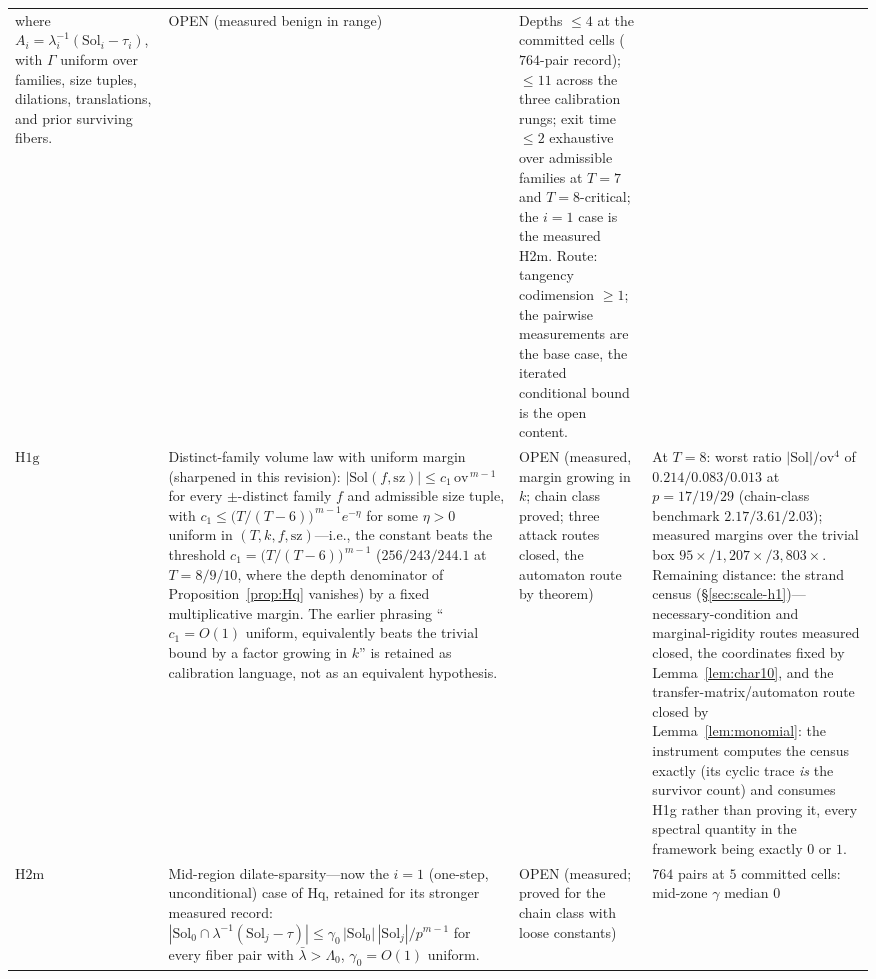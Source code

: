 {\begin{longtable}{@{}p{}p{}
                   p{}p{}@{}}
where $A_i=\lambda_i^{-1}(\mathrm{Sol}_i-\tau_i)$, with $\Gamma$
uniform over families, size tuples, dilations, translations, and prior
surviving fibers. &
OPEN (measured benign in range) &
Depths $\le 4$ at the committed cells ($764$-pair record); $\le 11$
across the three calibration rungs; exit time $\le 2$ exhaustive over
admissible families at $T=7$ and $T=8$-critical; the $i=1$ case is the
measured H2m. Route: tangency codimension $\ge 1$; the pairwise
measurements are the base case, the iterated conditional bound is the
open content. \\
$\mathrm{H1g}$ &
Distinct-family volume law with uniform margin (sharpened in this
revision): $|\mathrm{Sol}(f,\mathrm{sz})|\le
c_1\,\mathrm{ov}^{\,m-1}$ for every $\pm$-distinct family $f$ and
admissible size tuple, with $c_1\le\bigl(T/(T-6)\bigr)^{\,m-1}
e^{-\eta}$ for some $\eta>0$ uniform in $(T,k,f,\mathrm{sz})$---i.e.,
the constant beats the threshold
$c_1=\bigl(T/(T-6)\bigr)^{\,m-1}$ ($256/243/244.1$ at $T=8/9/10$,
where the depth denominator of Proposition~\ref{prop:Hq} vanishes) by
a fixed multiplicative margin. The earlier phrasing ``$c_1=O(1)$
uniform, equivalently beats the trivial bound by a factor growing in
$k$'' is retained as calibration language, not as an equivalent
hypothesis. &
OPEN (measured, margin growing in $k$; chain class proved; three
attack routes closed, the automaton route by theorem) &
At $T=8$: worst ratio $|\mathrm{Sol}|/\mathrm{ov}^4$ of
$0.214/0.083/0.013$ at $p=17/19/29$ (chain-class benchmark
$2.17/3.61/2.03$); measured margins over the trivial box
$95\times/1{,}207\times/3{,}803\times$. Remaining distance: the strand
census (\S\ref{sec:scale-h1})---necessary-condition and
marginal-rigidity routes measured closed, the coordinates fixed by
Lemma~\ref{lem:char10}, and the transfer-matrix/automaton route closed
by Lemma~\ref{lem:monomial}: the instrument computes the census exactly
(its cyclic trace \emph{is} the survivor count) and consumes H1g rather
than proving it, every spectral quantity in the framework being exactly
$0$ or $1$. \\
$\mathrm{H2m}$ &
Mid-region dilate-sparsity---now the $i=1$ (one-step, unconditional)
case of $\mathrm{Hq}$, retained for its stronger measured record:
$|\mathrm{Sol}_0\cap\lambda^{-1}(\mathrm{Sol}_j-\tau)|\le
\gamma_0\,|\mathrm{Sol}_0|\,|\mathrm{Sol}_j|/p^{m-1}$ for every fiber
pair with $\bar\lambda>\Lambda_0$, $\gamma_0=O(1)$ uniform. &
OPEN (measured; proved for the chain class with loose constants) &
$764$ pairs at $5$ committed cells: mid-zone $\gamma$ median $0$

\end{longtable}}
